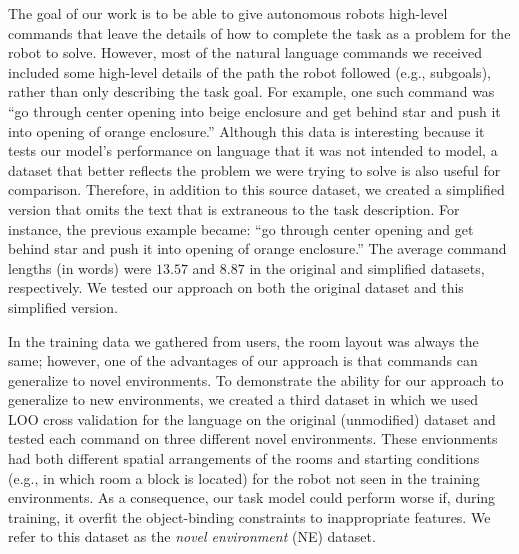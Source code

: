 \documentclass[conference]{IEEEtran}
\begin{document}
The goal of our work is to be able to give autonomous robots high-level commands that leave the details of how to complete the task as a problem for the robot to solve. However, most of the natural language commands we received included some high-level details of the path the robot followed (e.g., subgoals), rather than only describing the task goal. 
For example, one such command was ``go through center opening into beige enclosure and get behind star and push it into opening of orange enclosure.'' 
Although this data is interesting because it tests our model's performance on language that it was not intended to model, a dataset that better reflects the problem we were trying to solve is also useful for comparison. Therefore, in addition to this source dataset, we  created a simplified version that omits the text that is extraneous to the task description. 
For instance, the previous example became: ``go through center opening and get behind star and push it into opening of orange enclosure.'' 
The average command lengths (in words) were $13.57$ and $8.87$ in the original and simplified datasets, respectively. We tested our approach on both the original dataset and this simplified version.

In the training data we gathered from users, the room layout was always the same; however, one of the advantages of our approach is that commands can generalize to novel environments. To demonstrate the ability for our approach to generalize to new environments, we created a third dataset in which we used LOO cross validation for the language on the original (unmodified) dataset and tested each command on three different novel environments. These envionments had both different spatial arrangements of the rooms and starting conditions (e.g., in which room a block is located) for the robot not seen in the training environments.
As a consequence, our task model could perform worse if, during training, it overfit the object-binding constraints to inappropriate features. We refer to this dataset as the {\em novel environment} (NE) dataset.
\end{document}
